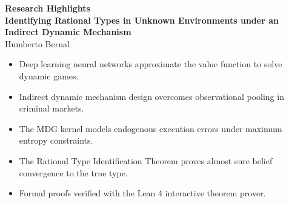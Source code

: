 \documentclass[12pt]{article}
\begin{document}
\doublespacing

\begin{center}
\textbf{Research Highlights} \\
\vspace{1em}
\textbf{Identifying Rational Types in Unknown Environments under an Indirect Dynamic Mechanism} \\
Humberto Bernal
\end{center}

\vspace{2em}

\begin{itemize}
    \item Deep learning neural networks approximate the value function to solve dynamic games.
    \item Indirect dynamic mechanism design overcomes observational pooling in criminal markets.
    \item The MDG kernel models endogenous execution errors under maximum entropy constraints.
    \item The Rational Type Identification Theorem proves almost sure belief convergence to the true type.
    \item Formal proofs verified with the Lean 4 interactive theorem prover.
\end{itemize}
\end{document}
